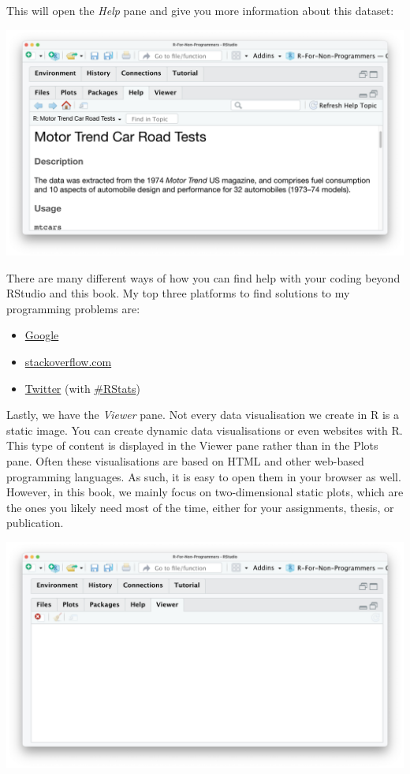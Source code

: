 \documentclass[
]{book}
\begin{document}
This will open the \emph{Help} pane and give you more information about this dataset:

\includegraphics{images/chapter_04_img/05_files_plots_etc/04_rstudio_help_mtcars.png}

There are many different ways of how you can find help with your coding beyond RStudio and this book. My top three platforms to find solutions to my programming problems are:

\begin{itemize}
\item
  \href{https://www.google.com}{Google}
\item
  \href{https://stackoverflow.com}{stackoverflow.com}
\item
  \href{https://twitter.com/home}{Twitter} (with \href{https://twitter.com/hashtag/rstats}{\#RStats})
\end{itemize}

Lastly, we have the \emph{Viewer} pane. Not every data visualisation we create in R is a static image. You can create dynamic data visualisations or even websites with R. This type of content is displayed in the Viewer pane rather than in the Plots pane. Often these visualisations are based on HTML and other web-based programming languages. As such, it is easy to open them in your browser as well. However, in this book, we mainly focus on two-dimensional static plots, which are the ones you likely need most of the time, either for your assignments, thesis, or publication.

\includegraphics{images/chapter_04_img/05_files_plots_etc/05_rstudio_viewer.png}
\end{document}
